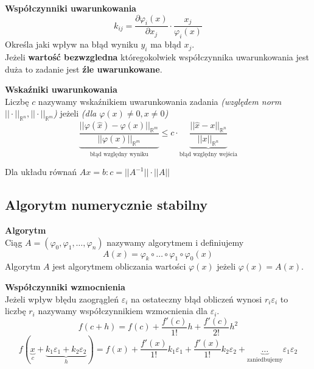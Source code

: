 \documentclass[../mn-notatki.tex]{subfiles}
\begin{document}
\begin{tcolorbox}
\textbf{Współczynniki uwarunkowania}\\
\[
k_{ij} = \frac{\partial \varphi_i(x)}{\partial x_j} \cdot \frac{x_j}{\varphi_i(x)}
\]
    Określa jaki wpływ na błąd wyniku $y_i$ ma błąd $x_j$.\\
     Jeżeli \textbf{wartość bezwzgledna} któregokolwiek współczynnika
uwarunkowania jest duża to zadanie jest \textbf{źle uwarunkowane}.

\end{tcolorbox}

\begin{tcolorbox}
\textbf{Wskaźniki uwarunkowania}\\
Liczbę $c$ nazywamy wskaźnikiem uwarunkowania zadania
\textit{(względem norm $||\cdot||_{\mathbb{R}^n}, ||\cdot||_{\mathbb{R}^m}$)}
jeżeli \textit{(dla $\varphi(x) \neq 0, x \neq 0$)}
\[
\underbrace{\frac{||\varphi(\hat{x}) - \varphi(x)||_{\mathbb{R}^m}}{||\varphi(x)||_{\mathbb{R}^m}}}_{\text{błąd względny wyniku}}
\leqslant
c  \cdot
\underbrace{\frac{||\hat{x} - x||_{\mathbb{R}^n}}{||x||_{\mathbb{R}^n}}}_{\text{błąd względny wejścia}}
\]

Dla układu równań
$Ax = b :
c = || A^ {−1}|| \cdot ||A||$
\end{tcolorbox}

\subsection{Algorytm numerycznie stabilny}

\begin{tcolorbox}
\textbf{Algorytm}\\
Ciąg $A = (\varphi_0, \varphi_1, \ldots, \varphi_n)$ nazywamy algorytmem i definiujemy
\[
A(x) = \varphi_k \circ \ldots \circ \varphi_1 \circ \varphi_0(x)
\]
Algorytm $A$ jest algorytmem obliczania wartości $\varphi(x)$ jeżeli
$\varphi(x) = A(x)$.
\end{tcolorbox}

\begin{tcolorbox}
\textbf{Współczynniki wzmocnienia}\\
Jeżeli wpływ błędu zaogrągleń $\varepsilon_i$ na ostateczny błąd obliczeń
wynosi $r_i \varepsilon_i$ to liczbę $r_i$ nazywamy współczynnikiem wzmocnienia
dla $\varepsilon_i$.
\[
f(c + h) =
f(c) +
\frac{f'(c)}{1!} h +
\frac{f'(c)}{2!} h^2
\]
\[
f(\underbrace{x}_{c} + \underbrace{k_1 \varepsilon_1 + k_2 \varepsilon_2}_h) =
f(x) +
\frac{f'(x)}{1!} k_1 \varepsilon_1 +
\frac{f'(x)}{1!} k_2 \varepsilon_2 +
\underbrace{\ldots}_{\text{zaniedbujemy}} \varepsilon_1 \varepsilon_2
\]
\end{tcolorbox}
\end{document}
